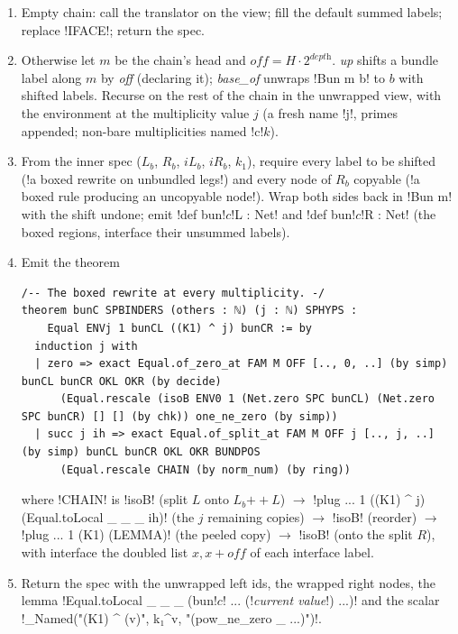 {\begin{algorithm}\label{alg:lean-export-net-lift}
\begin{enumerate}
\item Empty chain: call the translator on the view; fill the default summed labels; replace
  \code!IFACE!; return the spec.
\item Otherwise let $m$ be the chain's head and $\textit{off} = H\cdot2^{\textit{depth}}$.
  \textit{up} shifts a bundle label along $m$ by \textit{off} (declaring it); \textit{base\_of}
  unwraps \code!Bun m b! to $b$ with shifted labels. Recurse on the rest of the chain in the
  unwrapped view, with the environment at the multiplicity value $j$ (a fresh name \code!j!, primes
  appended; non-bare multiplicities named \code!c!$k$).
\item From the inner spec ($L_b$, $R_b$, $iL_b$, $iR_b$, $k_1$), require every label to be shifted
  (\code!a boxed rewrite on unbundled legs!) and every node of $R_b$ copyable
  (\code!a boxed rule producing an uncopyable node!). Wrap both sides back in \code!Bun m! with the
  shift undone; emit \code!def bun!$c$\code!L : Net! and \code!def bun!$c$\code!R : Net! (the
  boxed regions, interface their unsummed labels).
\item Emit the theorem
\begin{lstlisting}[style=grammar]
/-- The boxed rewrite at every multiplicity. -/
theorem bunC SPBINDERS (others : ℕ) (j : ℕ) SPHYPS :
    Equal ENVj 1 bunCL ((K1) ^ j) bunCR := by
  induction j with
  | zero => exact Equal.of_zero_at FAM M OFF [.., 0, ..] (by simp) bunCL bunCR OKL OKR (by decide)
      (Equal.rescale (isoB ENV0 1 (Net.zero SPC bunCL) (Net.zero SPC bunCR) [] [] (by chk)) one_ne_zero (by simp))
  | succ j ih => exact Equal.of_split_at FAM M OFF j [.., j, ..] (by simp) bunCL bunCR OKL OKR BUNDPOS
      (Equal.rescale CHAIN (by norm_num) (by ring))
\end{lstlisting}
  where \code!CHAIN! is \lean!isoB! (split $L$ onto $L_b \mathbin{+\!\!+} L$) $\to$
  \code!plug ... 1 ((K1) ^ j) (Equal.toLocal _ _ _ ih)! (the $j$ remaining copies) $\to$ \lean!isoB!
  (reorder) $\to$ \code!plug ... 1 (K1) (LEMMA)! (the peeled copy) $\to$ \lean!isoB! (onto the split
  $R$), with interface the doubled list $x, x+\textit{off}$ of each interface label.
\item Return the spec with the unwrapped left ids, the wrapped right nodes, the lemma
  \code!Equal.toLocal _ _ _ (bun!$c$\code! ... (!\textit{current value}\code!) ...)! and the scalar
  \py!_Named("(K1) ^ (v)", k₁^v, "(pow_ne_zero _ ...)")!.
\end{enumerate}
\end{algorithm}

}
